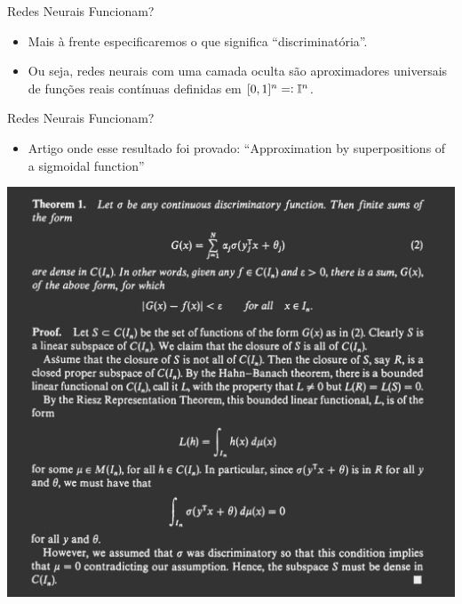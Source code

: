 \documentclass[13pt]{beamer}
\begin{document}
\begin{frame}{Redes Neurais Funcionam?}
    \begin{itemize}
        \item<1-> Mais à frente especificaremos o que significa ``discriminatória''.
        \item<2-> Ou seja, redes neurais com uma camada oculta são aproximadores universais de funções reais contínuas definidas em \( [0, 1]^{ n } = \vcentcolon \mathbb{I}^{ n } \).
    \end{itemize}
\end{frame}

\begin{frame}{Redes Neurais Funcionam?}
    \begin{itemize}
        \item<1-> Artigo onde esse resultado foi provado: ``Approximation by superpositions of a sigmoidal function'' \cite{cybenko89}
    \end{itemize}
    \begin{center}
        \includegraphics[width=.7\textwidth]{../figuras/cybenko.png}
    \end{center}
\end{frame}

\end{document}
